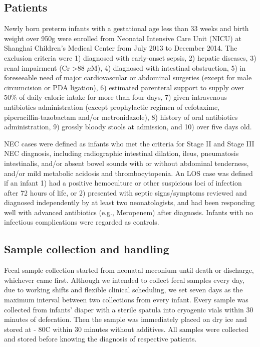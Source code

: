 \documentclass[fleqn,10pt, lineno]{wlpeerj} %
\begin{document}
  \subsection*{Patients}
  Newly born preterm infants with a gestational age less than 33 weeks and birth weight over 950g were enrolled from Neonatal Intensive Care Unit (NICU) at Shanghai Children’s Medical Center from July 2013 to December 2014. The exclusion criteria were 1) diagnosed with early-onset sepsis, 2) hepatic diseases, 3) renal impairment (Cr \textgreater 88 $\mu$M), 4) diagnosed with intestinal obstruction, 5) in foreseeable need of major cardiovascular or abdominal surgeries (except for male circumcision or PDA ligation), 6) estimated parenteral support to supply over 50\% of daily caloric intake for more than four days, 7) given intravenous antibiotics administration (except prophylactic regimen of cefotaxime, piperacillin-tazobactam and/or metronidazole), 8) history of oral antibiotics administration, 9) grossly bloody stools at admission, and 10) over five days old.

  NEC cases were defined as infants who met the criteria for Stage II and Stage III NEC diagnosis\citep{bell1978neonatal}, including radiographic intestinal dilation, ileus, pneumatosis intestinalis, and/or absent bowel sounds with or without abdominal tenderness, and/or mild metabolic acidosis and thrombocytopenia. An LOS case was defined if an infant 1) had a positive hemoculture or other suspicious loci of infection after 72 hours of life, or 2) presented with septic signs/symptoms reviewed and diagnosed independently by at least two neonatologists, and had been responding well with advanced antibiotics (e.g., Meropenem) after diagnosis. Infants with no infectious complications were regarded as controls.

  \subsection*{Sample collection and handling}
  Fecal sample collection started from neonatal meconium until death or discharge, whichever came first. Although we intended to collect fecal samples every day, due to working shifts and flexible clinical scheduling, we set seven days as the maximum interval between two collections from every infant. Every sample was collected from infants’ diaper with a sterile spatula into cryogenic vials within 30 minutes of defecation. Then the sample was immediately placed on dry ice and stored at - 80\textdegree{}C within 30 minutes without additives. All samples were collected and stored before knowing the diagnosis of respective patients.
\end{document}
